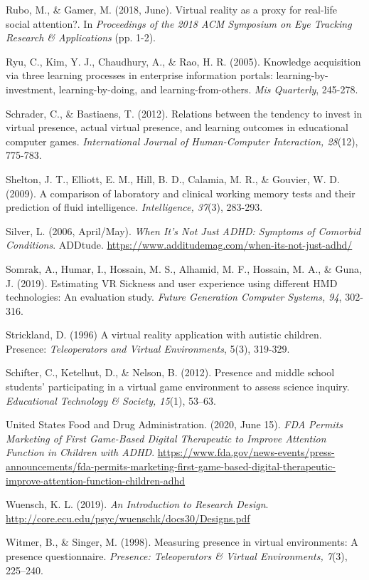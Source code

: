 \documentclass[11.5pt]{sig-alternate} %
\begin{document}
Rubo, M., \& Gamer, M. (2018, June). Virtual reality as a proxy for real-life social attention?. In \textit{Proceedings of the 2018 ACM Symposium on Eye Tracking Research \& Applications} (pp. 1-2).

Ryu, C., Kim, Y. J., Chaudhury, A., \& Rao, H. R. (2005). Knowledge acquisition via three learning processes in enterprise information portals: learning-by-investment, learning-by-doing, and learning-from-others. \textit{Mis Quarterly}, 245-278.
 
Schrader, C., \& Bastiaens, T. (2012). Relations between the tendency to invest in virtual 	presence, actual virtual presence, and learning outcomes in educational computer games. \textit{International Journal of Human-Computer Interaction, 28}(12), 775-783.

Shelton, J. T., Elliott, E. M., Hill, B. D., Calamia, M. R., \& Gouvier, W. D. (2009). A comparison of laboratory and clinical working memory tests and their prediction of fluid intelligence. \textit{Intelligence, 37}(3), 283-293.

Silver, L. (2006, April/May). \textit{When It’s Not Just ADHD: Symptoms of Comorbid Conditions}. ADDtude. \url{https://www.additudemag.com/when-its-not-just-adhd/}

Somrak, A., Humar, I., Hossain, M. S., Alhamid, M. F., Hossain, M. A., \& Guna, J. (2019). 	Estimating VR Sickness and user experience using different HMD technologies: An evaluation study. \textit{Future Generation Computer Systems, 94}, 302-316.

Strickland, D. (1996) A virtual reality application with autistic children. Presence: \textit{Teleoperators and Virtual Environments}, 5(3), 319-329.

Schifter, C., Ketelhut, D., \& Nelson, B. (2012). Presence and middle school students’ participating in a virtual game environment to assess science inquiry. \textit{Educational Technology \& Society, 15}(1), 53–63.

United States Food and Drug Administration. (2020, June 15). \textit{FDA Permits Marketing of First Game-Based Digital Therapeutic to Improve Attention Function in Children with ADHD}. \url{https://www.fda.gov/news-events/press-announcements/fda-permits-marketing-first-game-based-digital-therapeutic-improve-attention-function-children-adhd}

Wuensch, K. L. (2019). \textit{An Introduction to Research Design}. \url{http://core.ecu.edu/psyc/wuenschk/docs30/Designs.pdf}

Witmer, B., \& Singer, M. (1998). Measuring presence in virtual environments: A presence questionnaire. \textit{Presence: Teleoperators \& Virtual Environments, 7}(3), 225–240.
\end{document}
